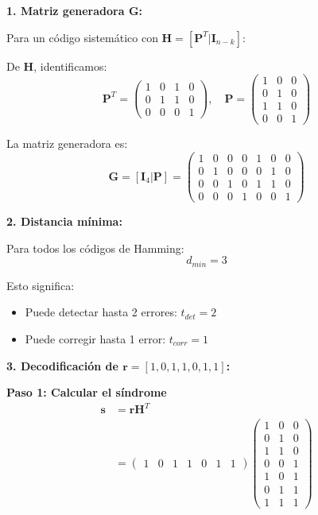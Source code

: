 \documentclass[10pt,a4paper]{article}
\begin{document}
\begin{solucion}
\textbf{1. Matriz generadora $\mathbf{G}$:}

Para un código sistemático con $\mathbf{H} = [\mathbf{P}^T | \mathbf{I}_{n-k}]$:

De $\mathbf{H}$, identificamos:
\[
\mathbf{P}^T = \begin{pmatrix}
1 & 0 & 1 & 0\\
0 & 1 & 1 & 0\\
0 & 0 & 0 & 1
\end{pmatrix}, \quad
\mathbf{P} = \begin{pmatrix}
1 & 0 & 0\\
0 & 1 & 0\\
1 & 1 & 0\\
0 & 0 & 1
\end{pmatrix}
\]

La matriz generadora es:
\[
\boxed{\mathbf{G} = [\mathbf{I}_4 | \mathbf{P}] = \begin{pmatrix}
1 & 0 & 0 & 0 & 1 & 0 & 0\\
0 & 1 & 0 & 0 & 0 & 1 & 0\\
0 & 0 & 1 & 0 & 1 & 1 & 0\\
0 & 0 & 0 & 1 & 0 & 0 & 1
\end{pmatrix}}
\]

\textbf{2. Distancia mínima:}

Para todos los códigos de Hamming:
\[
\boxed{d_{min} = 3}
\]

Esto significa:
\begin{itemize}
\item Puede detectar hasta 2 errores: $t_{det} = 2$
\item Puede corregir hasta 1 error: $t_{corr} = 1$
\end{itemize}

\textbf{3. Decodificación de $\mathbf{r} = [1, 0, 1, 1, 0, 1, 1]$:}

\textbf{Paso 1: Calcular el síndrome}
\begin{align*}
\mathbf{s} &= \mathbf{r} \mathbf{H}^T\\
&= \begin{pmatrix} 1 & 0 & 1 & 1 & 0 & 1 & 1 \end{pmatrix}
\begin{pmatrix}
1 & 0 & 0\\
0 & 1 & 0\\
1 & 1 & 0\\
0 & 0 & 1\\
1 & 0 & 1\\
0 & 1 & 1\\
1 & 1 & 1
\end{pmatrix}
\end{align*}


\end{solucion}
\end{document}
